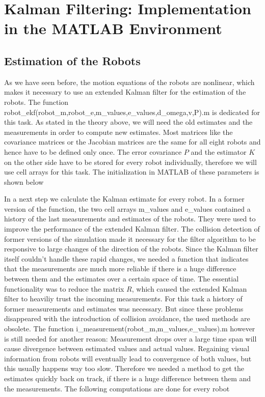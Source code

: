 
\chapter{Kalman Filtering: Implementation in the MATLAB Environment}

\section{Estimation of the Robots}

As we have seen before, the motion equations of the robots are nonlinear, which makes it necessary to use an extended Kalman filter for the estimation of the robots. The function {\selectfont robot\_ekf(robot\_m,robot\_e,m\_values,e\_values,d\_omega,v,P).m} is dedicated for this task. As stated in the theory above, we will need the old estimates and the measurements in order to compute new estimates. Most matrices like the covariance matrices or the Jacobian matrices are the same for all eight robots and hence have to be defined only once. The error covariance \(P\) and the estimator \(K\) on the other side have to be stored for every robot individually, therefore we will use cell arrays for this task. The initialization in MATLAB of these parameters is shown below


\parskip 20pt

In a next step we calculate the Kalman estimate for every robot. In a former version of the function, the two cell arrays {\selectfont m\_values} and {\selectfont e\_values} contained a history of the last measurements and estimates of the robots. They were used to improve the performance of the extended Kalman filter. The collision detection of former versions of the simulation made it necessary for the filter algorithm to be responsive to large changes of the direction of the robots. Since the Kalman filter itself couldn't handle these rapid changes, we needed a function that indicates that the measurements are much more reliable if there is a huge difference between them and the estimates over a certain space of time. The essential functionality was  to reduce the matrix \(R\), which caused the extended Kalman filter to heaviliy trust the incoming measurements. For this task a history of former measurements and estimates was necessary. But since these problems disappeared with the introduction of collision avoidance, the used methods are obsolete. The function {\selectfont i\_measurement(robot\_m,m\_values,e\_values).m} however is still needed for another reason: Measurement drops over a large time span will cause divergence between estimated values and actual values. Regaining visual information from robots will eventually lead to convergence of both values, but this usually happens way too slow. Therefore we needed a method to get the estimates quickly back on track, if there is a huge difference between them and the measurements. The following computations are done for every robot

